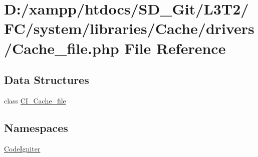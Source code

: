 \hypertarget{_cache__file_8php}{}\section{D\+:/xampp/htdocs/\+S\+D\+\_\+\+Git/\+L3\+T2/\+F\+C/system/libraries/\+Cache/drivers/\+Cache\+\_\+file.php File Reference}
\label{_cache__file_8php}
\subsection*{Data Structures}
\begin{DoxyCompactItemize}
\item 
class \hyperlink{class_c_i___cache__file}{C\+I\+\_\+\+Cache\+\_\+file}
\end{DoxyCompactItemize}
\subsection*{Namespaces}
\begin{DoxyCompactItemize}
\item 
 \hyperlink{namespace_code_igniter}{Code\+Igniter}
\end{DoxyCompactItemize}
